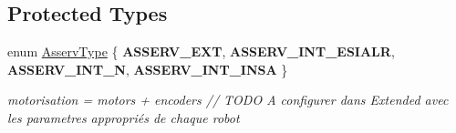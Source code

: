 \subsection*{Protected Types}
\begin{DoxyCompactItemize}
\item 
enum \hyperlink{classAsserv_ad1cfde496b9ab7fb2cf6fa0d2cf6d8fc}{Asserv\+Type} \{ {\bfseries A\+S\+S\+E\+R\+V\+\_\+\+E\+XT}, 
{\bfseries A\+S\+S\+E\+R\+V\+\_\+\+I\+N\+T\+\_\+\+E\+S\+I\+A\+LR}, 
{\bfseries A\+S\+S\+E\+R\+V\+\_\+\+I\+N\+T\+\_\+N}, 
{\bfseries A\+S\+S\+E\+R\+V\+\_\+\+I\+N\+T\+\_\+\+I\+N\+SA}
 \}\begin{DoxyCompactList}\small\item\em motorisation = motors + encoders // T\+O\+DO A configurer dans Extended avec les parametres appropriés de chaque robot \end{DoxyCompactList}
\end{DoxyCompactItemize}

